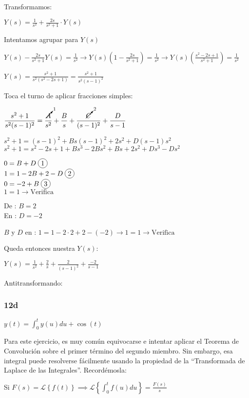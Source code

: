 \documentclass[11pt]{article}
\newcommand{\lapl}[1]{\mathscr{L} \left\lbrace {#1} \right\rbrace}
\newcommand*\circled[1]{\tikz[baseline=(char.base)]{
		\node[shape=circle,draw,inner sep=2pt] (char) {#1};}}
\begin{document}
	Transformamos:
	
	$\displaystyle Y(s)=\frac{1}{s^2}+ \frac{2s}{s^2+1}\cdot Y(s)$
	
	Intentamos agrupar para $Y(s)$
	
	$\displaystyle Y(s)-\frac{2s}{s^2+1}Y(s)=\frac{1}{s^2} \rightarrow Y(s)\left(1-\frac{2s}{s^2+1}\right)=\frac{1}{s^2} \rightarrow Y(s)\left(\frac{s^2-2s+1}{s^2+1}\right)=\frac{1}{s^2}$
	
	$\displaystyle Y(s)=\frac{s^2+1}{s^2(s^2-2s+1)}=\frac{s^2+1}{s^2(s-1)^2}$
	
	Toca el turno de aplicar fracciones simples:
	
	$\displaystyle \frac{s^2+1}{s^2(s-1)^2}=\frac{\cancelto{1}{A}}{s^2}+\frac{B}{s}+\frac{\cancelto{2}{C}}{(s-1)^2}+\frac{D}{s-1}$
	
	$s^2+1=(s-1)^2+Bs(s-1)^2+2s^2+D(s-1)s^2$\\
	$s^2+1=s^2-2s+1+Bs^3-2Bs^2+Bs+2s^2+Ds^3-Ds^2$
	
	$0=B+D \; \circled{1}$\\
	$1=1-2B+2-D \; \circled{2}$\\
	$0=-2+B \; \circled{3}$\\
	$1=1 \rightarrow \mathrm{Verifica}$
	
	De \circled{3}: $B=2$\\
	En \circled{1}: $D=-2$
	
	$B$ y $D$ en \circled{2}: $1=1-2\cdot 2 + 2 - (-2) \rightarrow 1=1 \rightarrow \mathrm{Verifica}$
	
	Queda entonces nuestra $Y(s)$:
	
	$\displaystyle Y(s)=\frac{1}{s^2}+\frac{2}{s}+\frac{2}{(s-1)^2}+\frac{-2}{s-1}$
	
	Antitransformando:
	
	
	\subsubsection{12d}
	$\displaystyle y(t)=\int_{0}^{t}y(u)du+\cos(t)$
	
	Para este ejercicio, es muy común equivocarse e intentar aplicar el Teorema de Convolución sobre el primer término del segundo miembro. Sin embargo, esa integral puede resolverse fácilmente usando la propiedad de la ``Transformada de Laplace de las Integrales''. Recordémosla:
	
	Si $\displaystyle F(s)=\lapl{f(t)} \implies \lapl{\int_{0}^{t}f(u)du}=\frac{F(s)}{s}$
	
\end{document}
